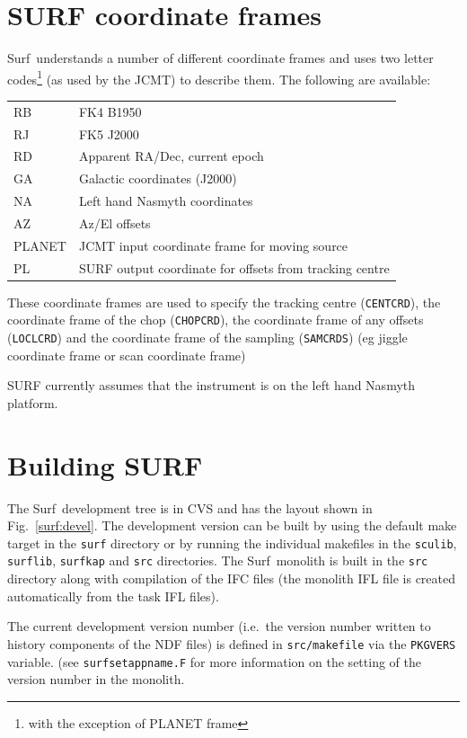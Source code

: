 \documentclass[twoside,11pt]{article}
\newcommand{\scusoft}          {{\sc Surf}}
\renewcommand{\_}{\texttt{\symbol{95}}}
\begin{document}
\section{SURF coordinate frames\label{app:frames}}

\scusoft\ understands a number of different coordinate frames and uses
two letter codes\footnote{with the exception of PLANET frame}
(as used by the JCMT) to describe them. The following
are available:

\begin{tabular}{ll}
RB & FK4 B1950\\
RJ & FK5 J2000\\
RD & Apparent RA/Dec, current epoch\\
GA & Galactic coordinates (J2000) \\
NA & Left hand Nasmyth coordinates \\
AZ & Az/El offsets \\
PLANET & JCMT input coordinate frame for moving source \\
PL & SURF output coordinate for offsets from tracking centre\\
\end{tabular}

These coordinate frames are used to specify the tracking centre
(\texttt{CENT\_CRD}), the coordinate frame of the chop (\texttt{CHOP\_CRD}),
the coordinate frame of any offsets (\texttt{LOCL\_CRD}) and the coordinate
frame of the sampling (\texttt{SAM\_CRDS}) (eg jiggle coordinate frame or scan
coordinate frame)

SURF currently assumes that the instrument is on the left hand Nasmyth
platform.

\section{Building SURF}

The \scusoft\ development tree is in CVS and has the layout shown in
Fig.\ \ref{surf:devel}. The development version can be built
by using the default make target in the \texttt{surf} directory or
by running the individual makefiles in the \texttt{sculib}, \texttt{surflib},
\texttt{surf\_kap} and \texttt{src} directories. The \scusoft\ monolith is
built in the \texttt{src} directory along with compilation of the IFC files
(the monolith IFL file is created automatically from the task IFL files).

The current development version number (i.e.\ the version number written to
history components of the NDF files) is defined in \texttt{src/makefile}
via the \texttt{PKG\_VERS} variable. (see \texttt{surf\_set\_app\_name.F} for
more information on the setting of the version number in the monolith.
\end{document}
